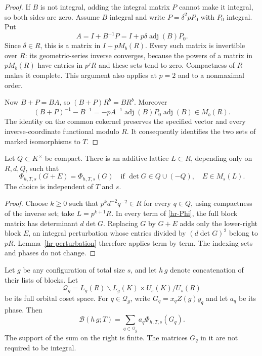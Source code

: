 \begin{proof}
If $B$ is not integral, adding the integral matrix $P$ cannot
make it integral, so both sides are zero. Assume $B$ integral
and write $P=\delta^2pP_0$ with $P_0$ integral. Put
\[
 A=I+B^{-1}P=I+p\delta\operatorname{adj}(B)P_0.
\]
Since $\delta\in R$, this is a matrix in $I+pM_b(R)$.
Every such matrix is invertible over $R$: its geometric-series
inverse converges, because the powers of a matrix in $pM_b(R)$
have entries in $p^jR$ and these sets tend to zero. Compactness
of $R$ makes it complete. This argument also applies at $p=2$
and to a nonmaximal order.

Now $B+P=BA$, so $(B+P)R^b=BR^b$. Moreover
\[
 (B+P)^{-1}-B^{-1}
   =-pA^{-1}\operatorname{adj}(B)P_0\operatorname{adj}(B)
                                                     \in M_b(R).
\]
The identity on the common cokernel preserves the specified
vector and every inverse-coordinate functional modulo $R$.
It consequently identifies the two sets of marked
isomorphisms to $T$.
\end{proof}

\begin{corollary}\label{hr-local-constancy}
Let $Q\subset K^\times$ be compact. There is an additive
lattice $L\subset R$, depending only on $R,d,Q$, such that
\[
 \Phi_{h,T,s}(G+E)=\Phi_{h,T,s}(G)
 \quad\text{if }\det G\in Q\cup(-Q),\quad E\in M_s(L).
\]
The choice is independent of $T$ and $s$.
\end{corollary}

\begin{proof}
Choose $k\ge0$ such that $p^kd^{-2}q^{-2}\in R$ for every
$q\in Q$, using compactness of the inverse set; take
$L=p^{k+1}R$. In every term of \eqref{hr-Phi}, the full block
matrix has determinant $d\det G$. Replacing $G$ by $G+E$
adds only the lower-right block $E$, an integral perturbation
whose entries divided by $(d\det G)^2$ belong to $pR$.
Lemma~\ref{hr-perturbation} therefore applies term by term.
The indexing sets and phases do not change.
\end{proof}

\begin{proposition}\label{hr-sum-identity}
Let $g$ be any configuration of total size $s$, and let $h\,g$
denote concatenation of their lists of blocks. Let
\[
 \mathcal Q_g=L_g(R)\backslash L_g(K)\times U_s(K)/U_s(R)
\]
be its full orbital coset space. For $q\in\mathcal Q_g$, write
$G_q=x_qZ(g)y_q$ and let $a_q$ be its phase. Then
\begin{equation}\label{hr-orbital-sum}
 \mathcal B(h\,g;T)
           =\sum_{q\in\mathcal Q_g}a_q\Phi_{h,T,s}(G_q).
\end{equation}
The support of the sum on the right is finite. The matrices
$G_q$ in it are not required to be integral.
\end{proposition}

